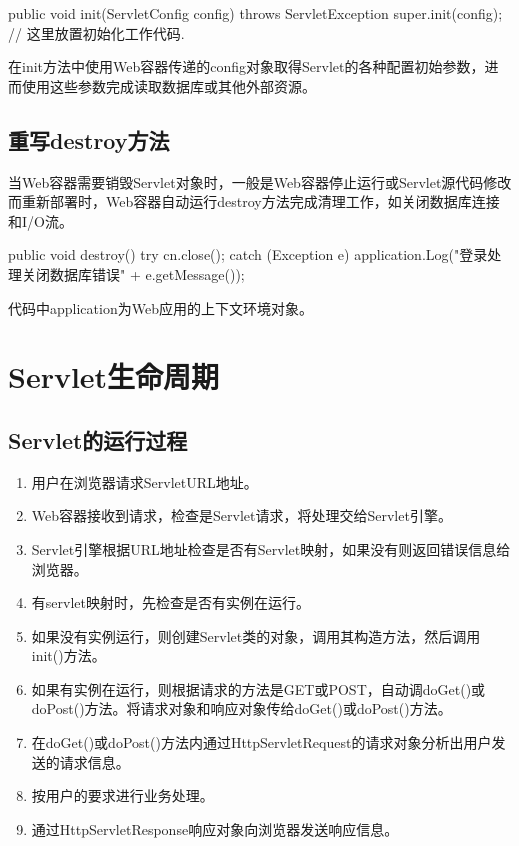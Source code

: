\begin{javaCode}
  public void init(ServletConfig config) throws ServletException {
    super.init(config);
    // 这里放置初始化工作代码.
  }
\end{javaCode}

{\kai 在init方法中使用Web容器传递的config对象取得Servlet的各种配置初始参数，进而使用这些参数完成读取数据库或其他外部资源。}

\subsection{重写destroy方法} 

当Web容器需要销毁Servlet对象时，一般是Web容器停止运行或Servlet源代码修改而重新部署时，Web容器自动运行destroy方法完成清理工作，如关闭数据库连接和I/O流。

\begin{javaCode}
  public  void destroy() {
    try {
      cn.close();
    } catch (Exception e) {
      application.Log("登录处理关闭数据库错误" + e.getMessage());
    }
  }
\end{javaCode}

{\kai 代码中application为Web应用的上下文环境对象。}

\section{Servlet生命周期}

\subsection{Servlet的运行过程} 

\begin{enumerate}
\item 用户在浏览器请求ServletURL地址。
\item Web容器接收到请求，检查是Servlet请求，将处理交给Servlet引擎。
\item Servlet引擎根据URL地址检查是否有Servlet映射，如果没有则返回错误信息给浏览器。
\item 有servlet映射时，先检查是否有实例在运行。
\item 如果没有实例运行，则创建Servlet类的对象，调用其构造方法，然后调用init()方法。
\item 如果有实例在运行，则根据请求的方法是GET或POST，自动调doGet()或doPost()方法。将请求对象和响应对象传给doGet()或doPost()方法。
\item 在doGet()或doPost()方法内通过HttpServletRequest的请求对象分析出用户发送的请求信息。
\item 按用户的要求进行业务处理。
\item 通过HttpServletResponse响应对象向浏览器发送响应信息。
\end{enumerate}

